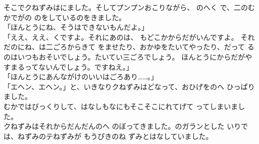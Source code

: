 \documentclass[
    a4paper,
    10pt,
    book]
    {tarticle}
\begin{document}
\newpage
\thispagestyle{fancy}
\indent そこでクねずみはにました。そしてプンプンおこりながら、
のへく
で、二のむかでがの
のをしているのをきました。\\
「ほんとうにね、そうはできないもんだよ。」\\
「ええ、ええ、くですよ。それにあのは、
もどこかからだがいんですよ。
それだのにね、は二ごろからきて
をませたり、おかゆをたいてやったり、だって
るのはいつもおそいでしょう。たいてい三ごろでしょう。
ほんとうにからだがやすまるってないんでしょう。ですねえ。」\\
「ほんとうにあんながけのいいはごろあり……。」\\
「エヘン、エヘン。」と、いきなりクねずみはどなって、おひげをのへ
ひっぱりました。\\
\indent むかではびっくりして、はなしもなにもそこそこにれてげて
ってしまいました。\\
\indent クねずみはそれからだんだんのへ
のぼってきました。のガランとした
いりでは、ねずみのテねずみが
もうぴきのね
ずみとはなしていました。\\
\end{document}
